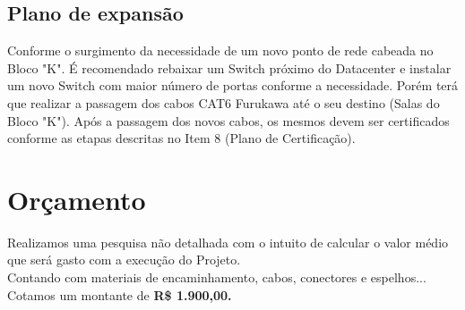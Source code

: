 \documentclass[	DIV=calc,%
paper=a4,%
fontsize=12pt,%
onecolumn]{scrartcl}	 					%
\begin{document}
	
	\subsection{Plano de expansão}
	
	Conforme o surgimento da necessidade de um novo ponto de rede cabeada no Bloco "K". É recomendado  rebaixar um Switch próximo do Datacenter e instalar um novo Switch com maior número de portas conforme a necessidade. Porém terá que realizar a passagem dos cabos CAT6 Furukawa até o seu destino (Salas do Bloco "K"). Após a passagem dos novos cabos, os mesmos devem ser certificados conforme as etapas descritas no Item 8 (Plano de Certificação).
	
	\section{Orçamento}
	Realizamos uma pesquisa não detalhada com o intuito de calcular o valor médio que será gasto com a execução do Projeto.
	\\
	Contando com materiais de encaminhamento, cabos, conectores e espelhos...
	\\
	Cotamos um montante de \textbf{R\$ 1.900,00.} 
	
\end{document}
